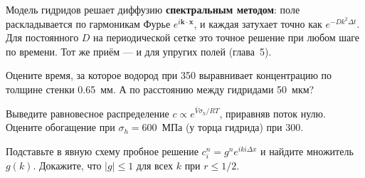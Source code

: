 Модель гидридов решает диффузию \textbf{спектральным методом}: поле раскладывается по гармоникам Фурье
$e^{i\mathbf k\cdot\mathbf x}$, и каждая затухает точно как $e^{-Dk^2\Delta t}$. Для постоянного $D$ на
периодической сетке это точное решение при любом шаге по времени. Тот же приём --- и для упругих полей
(глава~5).

\begin{exercise}
Оцените время, за которое водород при 350\degC{} выравнивает концентрацию по толщине стенки 0.65~мм.
А по расстоянию между гидридами 50~мкм?
\end{exercise}

\begin{exercise}
Выведите равновесное распределение $c\propto e^{\bar V\sigma_h/RT}$, приравняв поток нулю. Оцените обогащение при
$\sigma_h = 600$~МПа (у торца гидрида) при 300\degC.
\end{exercise}

\begin{exercise}
Подставьте в явную схему пробное решение $c_i^n = g^n e^{ik i\Delta x}$ и найдите множитель $g(k)$. Докажите, что
$|g|\le1$ для всех $k$ при $r\le1/2$.
\end{exercise}
